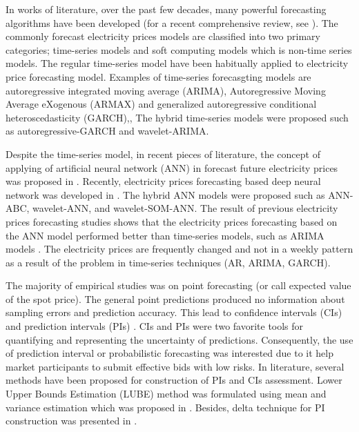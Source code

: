 \documentclass[review]{elsarticle}
\begin{document}
    In works of literature, over the past few decades, many powerful forecasting algorithms have been developed (for a recent comprehensive review, see \cite{Weron2014}).
    The commonly forecast electricity prices models are classified into two primary categories; time-series models and soft computing models which is non-time series models.
    The regular time-series model have been habitually applied to electricity price forecasting model.
    Examples of time-series forecasgting models are autoregressive integrated moving average (ARIMA)\cite{1216141}, Autoregressive Moving Average eXogenous (ARMAX)\cite{7917305} and generalized autoregressive conditional heteroscedasticity (GARCH)\cite{4344162},\cite{1627232},
    The hybrid time-series models were proposed such as autoregressive-GARCH\cite{Girish2016} and wavelet-ARIMA\cite{1425601}.

    Despite the time-series model, in recent pieces of literature, the concept of applying of artificial neural network (ANN) in forecast future electricity prices was proposed in \cite{Catalao2007}.
    Recently, electricity prices forecasting based deep neural network was developed in \cite{Kuo2018}.
    The hybrid ANN models were proposed such as ANN-ABC\cite{Chaweewat2017}, wavelet-ANN\cite{Bento2018}, and wavelet-SOM-ANN\cite{NAZAR2018214}.
    The result of previous electricity prices forecasting studies shows that the electricity prices forecasting based on the ANN model performed better than time-series models, such as ARIMA models \cite{Keles2016}.
    The electricity prices are frequently changed and not in a weekly pattern as a result of the problem in time-series techniques (AR, ARIMA, GARCH)\cite{4077090}.

    The majority of empirical studies was on point forecasting (or call expected value of the spot price).
    The general point predictions produced no information about sampling errors and prediction accuracy.
    This lead to confidence intervals (CIs) and prediction intervals (PIs) \cite{Weron2014}.
    CIs and PIs were two favorite tools for quantifying and representing the uncertainty of predictions.
    Consequently, the use of prediction interval or probabilistic forecasting was interested due to it help market participants to submit effective bids with low risks.
    In literature, several methods have been proposed for construction of PIs and CIs assessment.
    Lower Upper Bounds Estimation (LUBE) method was formulated using mean and variance estimation which was proposed in \cite{Khosravi2011}.
    Besides, delta technique for PI construction was presented in \cite{KhosraviA2010}.
\end{document}
